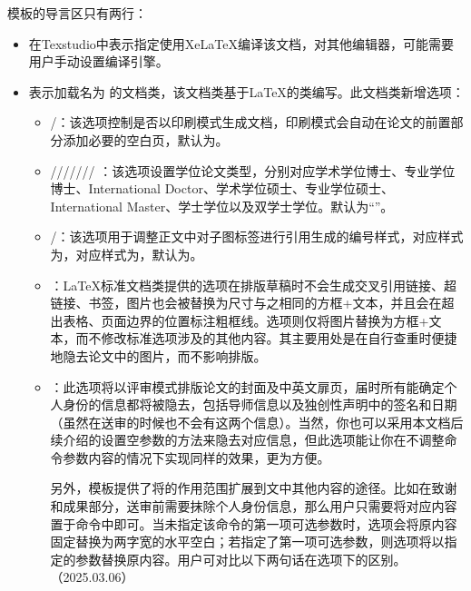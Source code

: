 \documentclass[print, doctor, vlined]{DissertUESTC}
\begin{document}
	模板的导言区只有两行：
	\begin{itemize}
		\item {}在Texstudio中表示指定使用XeLaTeX编译该文档，对其他编辑器，可能需要用户手动设置编译引擎。

		\item {}表示加载名为 的文档类，该文档类基于LaTeX的类编写。此文档类新增\textbf{}选项：

		\begin{itemize}
			\item {}/：该选项控制是否以印刷模式生成文档，印刷模式会自动在论文的前置部分添加必要的空白页，默认为。

			\item {}/////// ：该选项设置学位论文类型，分别对应学术学位博士、专业学位博士、International Doctor、学术学位硕士、专业学位硕士、International Master、学士学位以及双学士学位。默认为“”。
   
			\item {}/：该选项用于调整正文中对子图标签进行引用生成的编号样式，对应样式为，对应样式为，默认为。
   
			\item {}：LaTeX标准文档类提供的选项在排版草稿时不会生成交叉引用链接、超链接、书签，图片也会被替换为尺寸与之相同的方框+文本，并且会在超出表格、页面边界的位置标注粗框线。选项则仅将图片替换为方框+文本，而不修改标准选项涉及的其他内容。其主要用处是在自行查重时便捷地隐去论文中的图片，而不影响排版。
			
			\item {}：此选项将以评审模式排版论文的封面及中英文扉页，届时所有能确定个人身份的信息都将被隐去，包括导师信息以及独创性声明中的签名和日期（虽然在送审的时候也不会有这两个信息）。当然，你也可以采用本文档后续介绍的设置空参数的方法来隐去对应信息，但此选项能让你在不调整命令参数内容的情况下实现同样的效果，更为方便。
			
			另外，模板提供了将的作用范围扩展到文中其他内容的途径。比如在致谢和成果部分，送审前需要抹除个人身份信息，那么用户只需要将对应内容置于命令中即可。当未指定该命令的第一项可选参数时，选项会将原内容固定替换为两字宽的水平空白；若指定了第一项可选参数，则选项将以指定的参数替换原内容。用户可对比以下两句话在选项下的区别。（2025.03.06）


\end{itemize}
\end{itemize}
\end{document}
